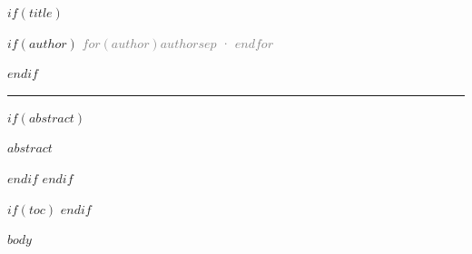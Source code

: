 \documentclass[11pt,a4paper]{article}
\makeatletter
\def\maketitle{
  \begin{center}
    \vspace*{1em}
    {\Huge\bfseries\color{headingcolor}\@title}\par
    \vspace{1.5em}
    $if(author)$
    {\large\textcolor{gray}{$for(author)$$author$$sep$ · $endfor$}}\par
    $endif$
    \vspace{0.5em}
    {\normalsize\textcolor{gray}{\@date}}\par
    \vspace{2em}
    \textcolor{codeframe}{\rule{0.5\textwidth}{2pt}}
    \vspace{2em}
  \end{center}
}
\renewenvironment{abstract}{
  \begin{center}
  \begin{minipage}{0.85\textwidth}
  \small\color{gray}
}{
  \end{minipage}
  \end{center}
  \vspace{1em}
}
\makeatother
\begin{document}
$if(title)$
\maketitle
$if(abstract)$
\begin{abstract}
$abstract$
\end{abstract}
$endif$
\thispagestyle{fancy}
$endif$

$if(toc)$
\tableofcontents
\newpage
$endif$

$body$
\end{document}
